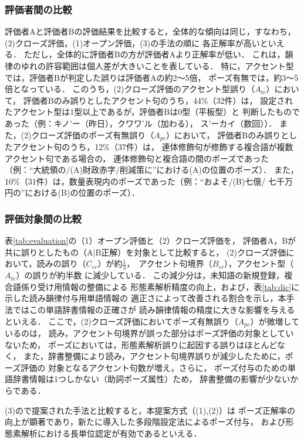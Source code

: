 \subsubsection{評価者間の比較}
評価者Aと評価者Bの評価結果を比較すると，全体的な傾向は同じ，すなわち，
(2)クローズ評価，(1)オープン評価，(3)\cite{Miyazaki1}の手法の順に
各正解率が高いといえる．
ただし，全体的に評価者Bの方が評価者Aより正解率が低い．
これは，韻律のゆれの許容範囲は個人差が大きいことを表している．
特に，アクセント型では，評価者Bが判定した誤りは評価者Aの約2〜5倍，
ポーズ有無では，約3〜5倍となっている．
このうち，(2)クローズ評価のアクセント型誤り（$A_{te}$）において，
評価者Bのみ誤りとしたアクセント句のうち，44\%（32件）は，
設定されたアクセント型は1型以上であるが，評価者Bは0型（平板型）と
判断したものであった（例：キノ'ー（昨日），クワワ'ル（加わる），
ス'ーカイ（数回））．
また，(2)クローズ評価のポーズ有無誤り（$A_{pe}$）において，
評価者Bのみ誤りとしたアクセント句のうち，12\%（37件）は，
連体修飾句が修飾する複合語が複数アクセント句である場合の，
連体修飾句と複合語の間のポーズであった
（例：``大統領の/(A)財政赤字/削減策に''における(A)の位置のポーズ）．
また，10\%（31件）は，数量表現内のポーズであった（例：``およそ/(B)七億/
七千万円の''における(B)の位置のポーズ）．

\subsubsection{評価対象間の比較}
表\ref{tab:evaluation}の（1）オープン評価と（2）クローズ評価を，
評価者A，Bが共に誤りとしたもの（A$\mid$B正解）を対象として比較すると，
(2)クローズ評価において，読みの誤り（$C_{er}$）が\mbox{約$\frac{1}{3}$，
アクセ}ント句境界（$B_{er}$），アクセント型（$A_{te}$）の誤りが約半数
に減少している．
この減少分は，未知語の新規登録，複合語係り受け用情報の整備による
形態素解析精度の向上，および，表\ref{tab:dic}に示した読み韻律付与用単語情報の
適正さによって改善される割合を示し，本手法ではこの単語辞書情報の正確さが
読み韻律情報の精度に大きな影響を与えるといえる．
ここで，(2)クローズ評価においてポーズ有無誤り（$A_{pe}$）が微増しているのは，
読み，アクセント句境界が誤った部分はポーズ評価の対象としていないため，
ポーズにおいては，形態素解析誤りに起因する誤りはほとんどなく，
また，辞書整備により読み，アクセント句境界誤りが減少したために，ポーズ評価の
対象となるアクセント句数が増え，さらに，
ポーズ付与のための単語辞書情報は1つしかない（助詞ポーズ属性）ため，
辞書整備の影響が少ないからである．

(3)の\cite{Miyazaki1}で提案された手法と比較すると，本提案方式（(1),(2)）は
ポーズ正解率の向上が顕著であり，新たに導入した多段階設定法によるポーズ付与，
および形態素解析における長単位認定が有効であるといえる．

